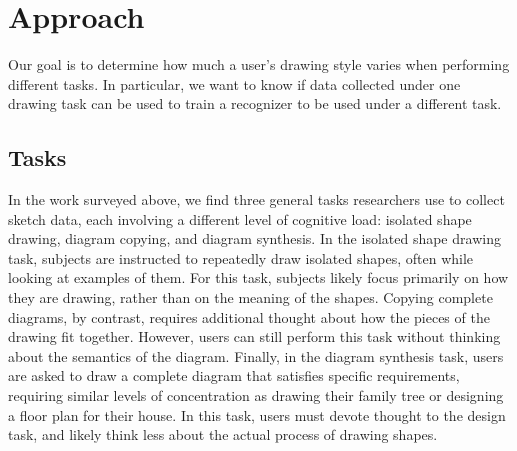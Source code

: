 \documentclass[final,5p,twocolumn]{elsarticle}
\begin{document}

\section{Approach}

Our goal is to determine how much a user's drawing style varies when
performing different tasks.  In particular, we want to know if
data collected under one drawing task can be used to train a recognizer to
be used under a different task.

\subsection{Tasks}

In the work surveyed above, we find three general tasks researchers use to
collect sketch data, each involving a different level of cognitive load:
isolated shape drawing, diagram copying, and diagram synthesis.  In the
isolated shape drawing task, subjects are instructed to repeatedly draw
isolated shapes, often while looking at examples of them.  For this task,
subjects likely focus primarily on how they are drawing, rather than on the
meaning of the shapes.  Copying complete diagrams, by contrast, requires
additional thought about how the pieces of the drawing fit together. However,
users can still perform this task without thinking about the semantics of the
diagram.  Finally, in the diagram synthesis task, users are asked to draw a
complete diagram that satisfies specific requirements, requiring similar 
levels of concentration as drawing their
family tree or designing a floor plan for their house.  In this task, users
must devote thought to the design task, and likely think less about the actual
process of drawing shapes.


\end{document}
